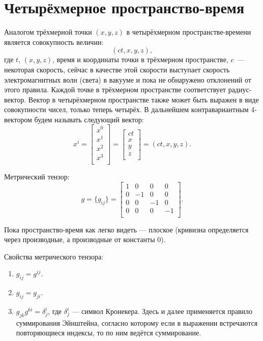 \documentclass[a4paper,14pt]{extreport} %
\begin{document}
	\chapter{Четырёхмерное пространство-время}
	
	Аналогом трёхмерной точки $(x, y, z)$ в четырёхмерном пространстве-времени является совокупность величин:
	\[
	(ct, x ,y, z),
	\]
	где $t$, $(x, y, z)$, время и координаты точки в трёхмерном пространстве, $c$~--- некоторая скорость, сейчас в качестве этой скорости выступает скорость электромагнитных волн (света) в вакууме и пока не обнаружено отклонений от этого правила. Каждой точке в трёхмерном пространстве соответствует радиус-вектор. Вектор в четырёхмерном пространстве также может быть выражен в виде совокупности чисел, только теперь четырёх. В дальнейшем контравариантным 4-вектором будем называть следующий вектор:
	\[
		x^i = 
		\begin{bmatrix}
			x^0 \\
			x^1 \\
			x^2 \\
			x^3 \\
		\end{bmatrix}
		=
		\begin{bmatrix}
			ct \\
			x \\
			y \\
			z \\
		\end{bmatrix} = (ct, x ,y, z).
	\] 

	Метрический тензор:
	\[
		g = \{g_{ij}\} =
		\begin{bmatrix}
			1 & 0 & 0 & 0 \\
			0 & -1 & 0 & 0 \\
			0 & 0 & -1 & 0 \\
			0 & 0 & 0 & -1 \\
		\end{bmatrix}.
	\] 
	
	Пока пространство-время как легко видеть --- плоское (кривизна определяется через производные, а производные от константы 0).
	
	Свойства метрического тензора:
	\begin{enumerate}
		\item $g_{ij} = g^{ij}$.
		\item $g_{ij} = g_{ji}$.
		\item $g_{jk}g^{ki} = \delta_j^i$, где $\delta_j^i$ --- символ Кронекера. Здесь и далее применяется правило суммирования Эйнштейна, согласно которому если в выражении встречаются повторяющиеся индексы, то по ним ведётся суммирование. 
	\end{enumerate}
	
\end{document}
